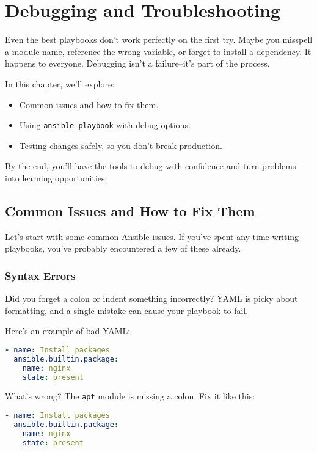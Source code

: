 \chapter{Debugging and Troubleshooting}

Even the best playbooks don't work perfectly on the first try. Maybe you misspell a module name, reference the wrong variable, or forget to install a dependency. It happens to everyone. Debugging isn't a failure--it's part of the process.

In this chapter, we'll explore:
\begin{itemize}
    \item Common issues and how to fix them.
    \item Using \texttt{ansible-playbook} with debug options.
    \item Testing changes safely, so you don't break production.
\end{itemize}

By the end, you'll have the tools to debug with confidence and turn problems into learning opportunities.


\section{Common Issues and How to Fix Them}

Let's start with some common Ansible issues. If you've spent any time writing playbooks, you've probably encountered a few of these already.

\subsection{Syntax Errors}

\textbf{D}id you forget a colon or indent something incorrectly? YAML is picky about formatting, and a single mistake can cause your playbook to fail.

Here's an example of bad YAML:
\begin{lstlisting}[language=yaml, caption=Bad YAML]
- name: Install packages
  ansible.builtin.package:
    name: nginx
    state: present
\end{lstlisting}

What's wrong? The \texttt{apt} module is missing a colon. Fix it like this:
\begin{lstlisting}[language=yaml, caption=Correct YAML]
- name: Install packages
  ansible.builtin.package:
    name: nginx
    state: present
\end{lstlisting}


